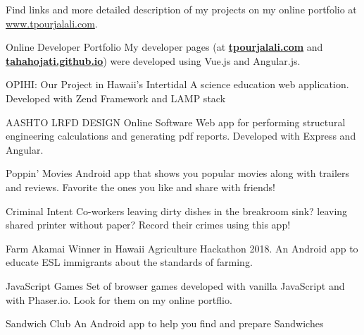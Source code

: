 
	Find links and more detailed description of my projects on my online portfolio at \mbox{\href{http://www.tpourjalali.com}{www.tpourjalali.com}}.
\begin{cventries}
	
	\cventry
	{\faLaptop\enspace Online Developer Portfolio}
	{}
	{}
	{}
	{My developer pages (at \textbf{\href{http://www.tpourjalali.com}{tpourjalali.com}} and \textbf{\href{https://tahahojati.github.io}{ tahahojati.github.io}}) were developed using Vue.js and Angular.js. }
	
	\cventry
	{\faLaptop \enspace OPIHI: Our Project in Hawaii's Intertidal}
	{}
	{}
	{}
	{A science education web application. Developed with Zend Framework and LAMP stack}
	
	\cventry
	{\faLaptop\enspace AASHTO LRFD DESIGN Online Software}
	{}
	{}
	{}
	{Web app for performing structural engineering calculations and generating pdf reports. Developed with Express and Angular. }
	
	
	\cventry
	{\faAndroid\enspace Poppin' Movies}
	{}
	{}
	{}
	{Android app that shows you popular movies along with trailers and reviews.  Favorite the ones you like and share with friends! }
	
	\cventry
	{\faAndroid\enspace Criminal Intent}
	{}
	{}
	{}
	{Co-workers leaving dirty dishes in the breakroom sink? leaving shared printer without paper? Record their crimes using this app!}

	
	
	\cventry
	{\faTrophy\faAndroid\enspace Farm Akamai}
	{}
	{}
	{}
	{Winner in Hawaii Agriculture Hackathon 2018. An Android app to educate ESL immigrants about the standards of farming.}

	\cventry
	{\faChrome\enspace JavaScript Games}
	{}
	{}
	{}
	{Set of browser games developed with vanilla JavaScript and with Phaser.io. Look for them on my online portflio.}
	
	\cventry
	{\faAndroid\enspace Sandwich Club}
	{}
	{}
	{}
	{An Android app to help you find and prepare Sandwiches}
			
	

\end{cventries}

